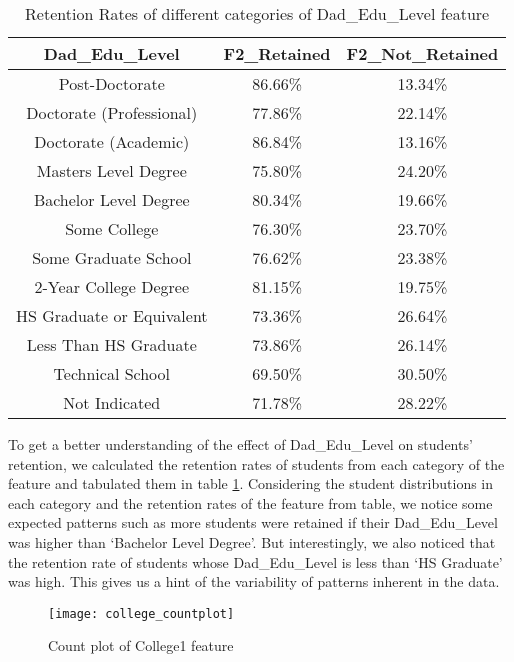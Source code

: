 \documentclass[11pt,openright]{report}
\begin{document}
\begin{table}
	\renewcommand{\arraystretch}{1.3}
	\caption{Retention Rates of different categories of Dad\_Edu\_Level feature}
	\label{table:dad_edu_retentions}
	\centering
	\begin{tabular}{|c|c|c|}
		\hline
		\bfseries Dad\_Edu\_Level & \bfseries F2\_Retained & \bfseries F2\_Not\_Retained\\
		\hline
		Post-Doctorate  & 86.66\%  & 13.34\% \\ \hline
		Doctorate (Professional) & 77.86\% &  22.14\% \\ \hline
		Doctorate (Academic) & 86.84\% & 13.16\% \\ \hline
		Masters Level Degree    &   75.80\% &  24.20\% \\ \hline
		Bachelor Level Degree &  80.34\%  & 19.66\% \\ \hline
		Some College & 76.30\% & 23.70\% \\ \hline
		Some Graduate School  & 76.62\% &  23.38\% \\ \hline
		2-Year College Degree    &  81.15\%  & 19.75\% \\ \hline
		HS Graduate or Equivalent  & 73.36\% &  26.64\% \\ \hline
		Less Than HS Graduate     & 73.86\% &  26.14\% \\ \hline
		Technical School  &         69.50\% &  30.50\% \\ \hline
		Not Indicated         &    71.78\% & 28.22\% \\ \hline
	\end{tabular}
\end{table}

To get a better understanding of the effect of Dad\_Edu\_Level on students' retention, we calculated the retention rates of students from each category of the feature and tabulated them in table \ref{table:dad_edu_retentions}. Considering the student distributions in each category and the retention rates of the feature from table, we notice some expected patterns such as more students were retained if their Dad\_Edu\_Level was higher than `Bachelor Level Degree'. But interestingly, we also noticed that the retention rate of students whose Dad\_Edu\_Level is less than `HS Graduate' was high. This gives us a hint of the variability of patterns inherent in the data.

\begin{figure}
	\centering
	\texttt{[image: college\_countplot]}
	\caption{Count plot of College1 feature}
	\label{fig:college_F2NotRetained_plot}
\end{figure}
\end{document}
